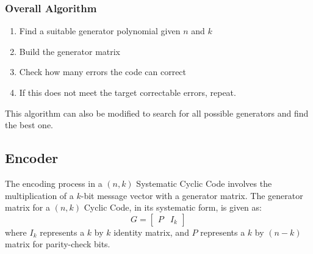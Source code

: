 \documentclass{article}
\begin{document}
\subsubsection{Overall Algorithm}
\begin{enumerate}
    \item Find a suitable generator polynomial given $n$ and $k$
    \item Build the generator matrix
    \item Check how many errors the code can correct
    \item If this does not meet the target correctable errors, repeat.
\end{enumerate}
This algorithm can also be modified to search for all possible generators and find the best one.

\subsection{Encoder}
The encoding process in a $(n,k)$ Systematic Cyclic Code involves the multiplication of a $k$-bit message vector with a generator matrix. The generator matrix for a $(n,k)$ Cyclic Code, in its systematic form, is given as:
\begin{equation*}
    G = \begin{bmatrix}
        P & I_{k}
    \end{bmatrix}
\end{equation*}
where $I_k$ represents a $k$ by $k$ identity matrix, and $P$ represents a $k$ by $(n-k)$ matrix for parity-check bits. 
\end{document}
